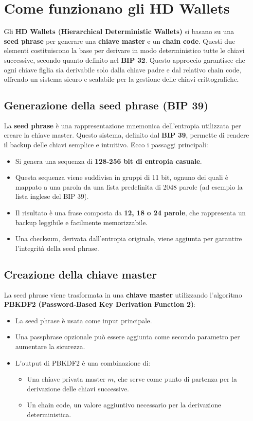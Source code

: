 \documentclass{article}
\begin{document}
\section{Come funzionano gli HD Wallets}
Gli \textbf{HD Wallets (Hierarchical Deterministic Wallets)} si basano su una \textbf{seed phrase} per generare una \textbf{chiave master} e un \textbf{chain code}. Questi due elementi costituiscono la base per derivare in modo deterministico tutte le chiavi successive, secondo quanto definito nel \textbf{BIP 32}. Questo approccio garantisce che ogni chiave figlia sia derivabile solo dalla chiave padre e dal relativo chain code, offrendo un sistema sicuro e scalabile per la gestione delle chiavi crittografiche.

\subsection{Generazione della seed phrase (BIP 39)}
La \textbf{seed phrase} è una rappresentazione mnemonica dell'entropia utilizzata per creare la chiave master. Questo sistema, definito dal \textbf{BIP 39}, permette di rendere il backup delle chiavi semplice e intuitivo. Ecco i passaggi principali:
\begin{itemize}
    \item Si genera una sequenza di \textbf{128-256 bit di entropia casuale}.
    \item Questa sequenza viene suddivisa in gruppi di 11 bit, ognuno dei quali è mappato a una parola da una lista predefinita di 2048 parole (ad esempio la lista inglese del BIP 39).
    \item Il risultato è una frase composta da \textbf{12, 18 o 24 parole}, che rappresenta un backup leggibile e facilmente memorizzabile.
    \item Una checksum, derivata dall'entropia originale, viene aggiunta per garantire l'integrità della seed phrase.
\end{itemize}

\subsection{Creazione della chiave master}
La seed phrase viene trasformata in una \textbf{chiave master} utilizzando l'algoritmo \textbf{PBKDF2 (Password-Based Key Derivation Function 2)}:
\begin{itemize}
    \item La seed phrase è usata come input principale.
    \item Una passphrase opzionale può essere aggiunta come secondo parametro per aumentare la sicurezza.
    \item L'output di PBKDF2 è una combinazione di:
    \begin{itemize}
        \item Una chiave privata master \(m\), che serve come punto di partenza per la derivazione delle chiavi successive.
        \item Un chain code, un valore aggiuntivo necessario per la derivazione deterministica.
    \end{itemize}
\end{itemize}
\end{document}
